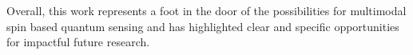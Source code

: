Overall, this work represents a foot in the door of the possibilities for multimodal spin based quantum sensing and has highlighted clear and specific opportunities for impactful future research. 




 



%
%
%
%

